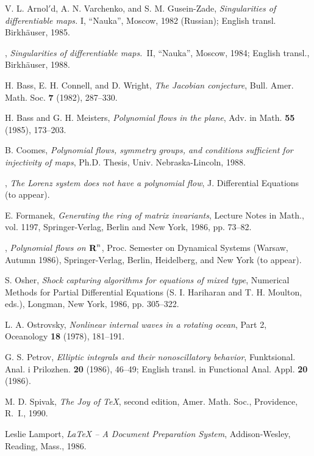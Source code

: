 \begin{thebibliography}{10}

 V. L. Arnol$'$d, A. N. Varchenko, and S. M. Gusein-Zade,
 {\em Singularities of differentiable maps.} I,
  ``Nauka'', Moscow, 1982 (Russian);
English transl. Birkh\"auser, 1985.

\bysame,
 {\em Singularities of differentiable maps.}~II,
  ``Nauka'', Moscow, 1984;
English transl., Birkh\"auser, 1988.


H. Bass, E. H. Connell, and D. Wright,
{\em The Jacobian conjecture}, Bull. Amer. Math. Soc.
 {\bf 7} (1982), 287--330.

H. Bass and G. H. Meisters,
{\em Polynomial flows in the plane}, Adv. in Math.
 {\bf 55} (1985), 173--203.

B. Coomes,
{\em Polynomial flows, symmetry groups, and conditions sufficient for 
        injectivity of maps},
 Ph.D. Thesis, Univ. Nebraska-Lincoln, 1988.


\bysame,
{\em The Lorenz system does not have a polynomial flow},
{J. Differential Equations} (to appear).

E. Formanek,
{\em Generating the ring of matrix invariants},
Lecture Notes in Math., vol. 1197,
Springer-Verlag, Berlin and New York,
1986, pp. 73--82.

\bysame,
{\em Polynomial flows on $\hbox{\bf R}^n$},
Proc. Semester on Dynamical Systems (Warsaw, Autumn 1986),
Springer-Verlag,
Berlin, Heidelberg, and New York
(to appear).

S. Osher,
{\em Shock capturing algorithms for equations of mixed type},
 Numerical Methods for Partial Differential Equations
(S. I. Hariharan and T. H. Moulton, eds.),
  Longman, New York, 1986, pp. 305--322.

L. A. Ostrovsky,
{\em Nonlinear internal waves in a rotating ocean},
Part 2, Oceanology {\bf 18} (1978), 181--191.

G. S. Petrov,
{\em Elliptic integrals and their nonoscillatory behavior},
Funktsional. Anal. i Pri\-lo\-zhen. {\bf 20} (1986), 46--49;
English transl. in Functional Anal. Appl. {\bf 20} (1986).

M. D. Spivak,
{\em The Joy of \TeX{}}, second edition, Amer. Math. Soc., Providence, R.~I., 
1990.

 Leslie Lamport, {\em \LaTeX{} -- A Document Preparation
System}, Addison-Wesley, Reading, Mass., 1986.

\end{thebibliography}



